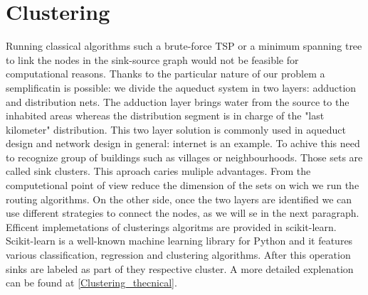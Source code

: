 \section{Clustering}
Running classical algorithms such a brute-force TSP or a minimum spanning tree to link
the nodes in the sink-source graph would not be feasible for computational reasons. 
Thanks to the particular nature of our problem a semplificatin is possible: we divide the aqueduct system
in two layers: adduction and distribution nets. The adduction layer brings water from the
source to the inhabited areas whereas the distribution segment is in charge of the "last
kilometer" distribution. This two layer solution is commonly used in aqueduct design and
network design in general: internet is an example.
To achive this need to recognize group of buildings such as villages or neighbourhoods. Those sets are called sink clusters.
This aproach caries muliple advantages. From the computetional point of view reduce the dimension of the sets on wich we run the routing algorithms.  On the other side, once the two layers are identified we can use different strategies to connect the nodes, as we will se in the next paragraph.
Efficent implemetations of clusterings algoritms are provided in scikit-learn. Scikit-learn is a well-known
machine learning library for Python and it features various classification, regression and
clustering algorithms. After this operation sinks are labeled as part of they respective cluster. 
A more detailed explenation can be found at \ref {Clustering_thecnical}.

